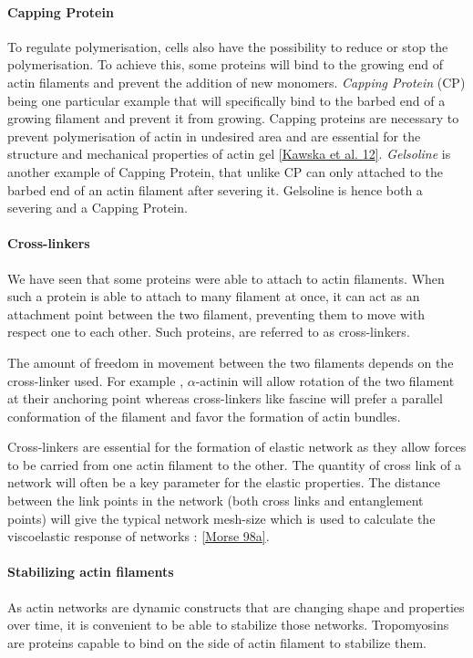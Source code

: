 \documentclass[A4paperpaper,11pt,english]{sphinxmanual}
\begin{document}
\paragraph{Capping Protein}
\label{index-latex:capping-protein}
To regulate polymerisation, cells also have the possibility to reduce or stop
the polymerisation. To achieve this, some proteins will bind to the growing end
of actin filaments and prevent the addition of new monomers.  \emph{Capping Protein}
(CP) being one particular example that will specifically bind to the barbed end
of a growing filament and  prevent it from growing. Capping proteins are
necessary to prevent polymerisation of actin in undesired area
and are essential for the structure and mechanical properties of actin gel
{\hyperref[index-latex:kawska2012]{{[}Kawska et al. 12{]}}}. \emph{Gelsoline} is another example of Capping Protein, that
unlike CP can only attached to the barbed end of an actin filament after
severing it. Gelsoline is hence both a severing and a Capping Protein.


\paragraph{Cross-linkers}
\label{index-latex:cross-linkers}
We have seen that some proteins were able to attach to actin filaments. When
such a protein is able to attach to many filament at once, it can act as an
attachment point between the two filament, preventing them to move with respect
one to each other. Such proteins, are referred to as cross-linkers.

The amount of freedom in movement between the two filaments depends on the
cross-linker used. For example , \(\alpha\)-actinin will allow rotation of the two
filament at their anchoring point whereas cross-linkers like fascine will prefer
a parallel conformation of the filament and favor the formation of actin
bundles.

Cross-linkers are essential for the formation of elastic network as they allow
forces to be carried from one actin filament to the other. The quantity of
cross link of a network will often be a key parameter for the elastic properties.
The distance between the link points in the network (both cross links
and entanglement points) will give the typical network mesh-size which is used
to calculate the viscoelastic response of networks : {\hyperref[index-latex:morse1998a]{{[}Morse 98a{]}}}.


\paragraph{Stabilizing actin filaments}
\label{index-latex:stabilizing-actin-filaments}
As actin networks are dynamic constructs that are changing shape and properties
over time, it is convenient to be able to stabilize those networks. Tropomyosins
are proteins capable to bind on the side of actin filament to stabilize them.
\end{document}
